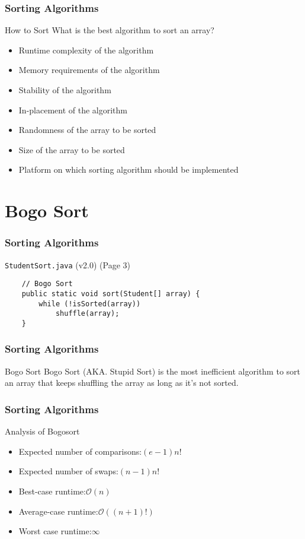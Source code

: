\documentclass[10pt, compress]{beamer}
\begin{document}
\begin{frame}[fragile]
	\frametitle{Sorting Algorithms}
	\begin{block}{How to Sort}
	What is the best algorithm to sort an array?
		\begin{itemize}
			\item[] Runtime complexity of the algorithm
			\item[] Memory requirements of the algorithm
			\item[] Stability of the algorithm
			\item[] In-placement of the algorithm
			\item[] Randomness of the array to be sorted
			\item[] Size of the array to be sorted
			\item[] Platform on which sorting algorithm should be implemented
		\end{itemize}
	\end{block}
\end{frame}

\section{Bogo Sort}

\begin{frame}[fragile]
	\frametitle{Sorting Algorithms}
	\begin{block}{\texttt{StudentSort.java} (v2.0) (Page 3)}
		\begin{verbatim}
	// Bogo Sort
	public static void sort(Student[] array) {
		while (!isSorted(array))
			shuffle(array);
	}
		\end{verbatim}
	\end{block}
\end{frame}

\begin{frame}[fragile]
	\frametitle{Sorting Algorithms}
	\begin{block}{Bogo Sort}
		Bogo Sort (AKA. Stupid Sort) is the most inefficient algorithm to sort an array that keeps shuffling the array as long as it's not sorted.
	\end{block}
\end{frame}

\begin{frame}[fragile]
	\frametitle{Sorting Algorithms}
	\begin{block}{Analysis of Bogosort}
		\begin{itemize}
			\item[] Expected number of comparisons:\hfill $(e-1)n!$
			\item[] Expected number of swaps:\hfill $(n-1)n!$
			\item[] Best-case runtime:\hfill $\mathcal{O}(n)$
			\item[] Average-case runtime:\hfill $\mathcal{O}((n+1)!)$
			\item[] Worst case runtime:\hfill $\infty$
		\end{itemize}
	\end{block}
\end{frame}
\end{document}
